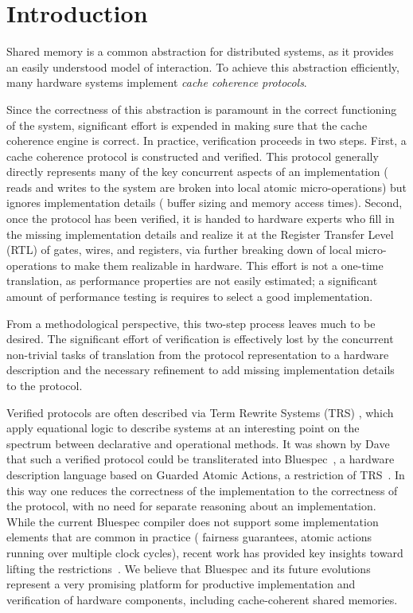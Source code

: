 \section{Introduction}
\label{sec:Introduction}

Shared memory is a common abstraction for distributed systems, as it provides
an easily understood model of interaction. To achieve this abstraction
efficiently, many hardware systems implement \emph{cache coherence
protocols}.

Since the correctness of this abstraction is paramount in the correct
functioning of the system, significant effort is expended in making sure that
the cache coherence engine is correct. In practice, verification proceeds in
two steps. First, a cache coherence protocol is constructed and verified. This
protocol generally directly represents many of the key concurrent aspects of an
implementation (\eg{} reads and writes to the system are broken into local
atomic micro-operations) but ignores implementation details (\eg{} buffer
sizing and memory access times). Second, once the protocol has been verified,
it is handed to hardware experts who fill in the missing implementation details
and realize it at the Register Transfer Level (RTL) of gates, wires, and
registers, via further breaking down of local micro-operations to make them
realizable in hardware. This effort is not a one-time translation, as
performance properties are not easily estimated; a significant amount of
performance testing is requires to select a good implementation. 

From a methodological perspective, this two-step process leaves much to be
desired. The significant effort of verification is effectively lost by the
concurrent non-trivial tasks of translation from the protocol representation to
a hardware description and the necessary refinement to add missing
implementation details to the protocol. 

Verified protocols are often described via Term Rewrite
Systems (TRS) , which apply equational logic to describe systems at an
interesting point on the spectrum between declarative and operational methods.
It was shown by Dave
\etal{}~\cite{DNA:CoherenceImplementation} that such a verified
protocol could be transliterated into Bluespec~\cite{Bluespec:TFRG}, a
hardware description language based on Guarded Atomic Actions, a
restriction of TRS~\cite{Hoe:TCAD}. In this way one reduces the correctness of
the implementation to the correctness of the protocol, with no need
for separate reasoning about an implementation. While the current Bluespec compiler
does not support some implementation elements that are common in practice
(\eg{} fairness guarantees, atomic actions running over multiple clock cycles),
recent work has provided key insights toward lifting the
restrictions~\cite{DNA:CoherenceImplementation, Karczmarek}.  We
believe that Bluespec and its future evolutions represent a
very promising platform for productive implementation and
verification of hardware components, including cache-coherent
shared memories.

